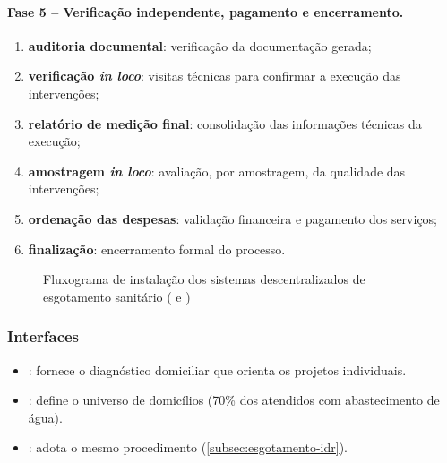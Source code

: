 \paragraph{Fase 5 -- Verificação independente, pagamento e encerramento.}
\begin{enumerate}[label=\alph*), resume]
  \item \textbf{auditoria documental}: verificação da documentação gerada;
  \item \textbf{verificação \textit{in loco}}: visitas técnicas para
        confirmar a execução das intervenções;
  \item \textbf{relatório de medição final}: consolidação das informações
        técnicas da execução;
  \item \textbf{amostragem \textit{in loco}}: avaliação, por amostragem, da
        qualidade das intervenções;
  \item \textbf{ordenação das despesas}: validação financeira e pagamento
        dos serviços;
  \item \textbf{finalização}: encerramento formal do processo.
\end{enumerate}

\begin{figure}[htbp]
  \centering
  \caption{Fluxograma de instalação dos sistemas descentralizados de esgotamento sanitário ( e )}
  \label{fig:fluxograma-esgotamento}
  
\end{figure}



\subsubsection{Interfaces}

\begin{itemize}
  \item {}: fornece o diagnóstico domiciliar que orienta os
        projetos individuais.
  \item {}: define o universo de domicílios (70\% dos
        atendidos com abastecimento de água).
  \item {}: adota o mesmo procedimento
        (\autoref{subsec:esgotamento-idr}).
\end{itemize}
